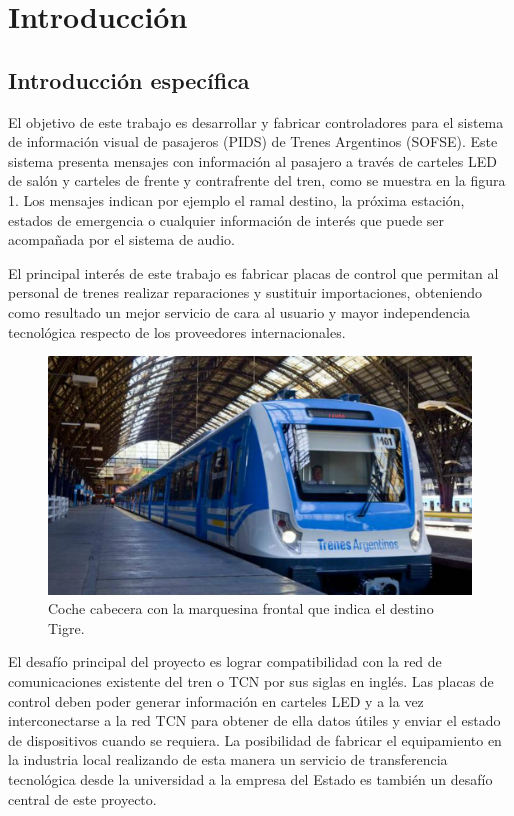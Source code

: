 \documentclass[
11pt, %
]{charter}
\begin{document}
\pagebreak


\section{Introducción}
\label{sec:intro}
\subsection{Introducción específica}
El objetivo de este trabajo es desarrollar y fabricar controladores para el sistema de información visual de pasajeros (PIDS) de Trenes Argentinos (SOFSE). Este sistema presenta mensajes con información al pasajero a través de carteles LED de salón y carteles de frente y contrafrente del tren, como se muestra en la figura 1. Los mensajes indican por ejemplo el ramal destino, la próxima estación, estados de emergencia o cualquier información de interés que puede ser acompañada por el sistema de audio.

El principal interés de este trabajo es fabricar placas de control que permitan al personal de trenes realizar reparaciones y sustituir importaciones, obteniendo como resultado un mejor servicio de cara al usuario y mayor independencia tecnológica respecto de los proveedores internacionales.\\

\begin{figure}[htpb]
\centering 
\includegraphics[width=.75\textwidth]{./Pics/tren.jpg}
\caption{Coche cabecera con la marquesina frontal que indica el destino Tigre.}
\label{fig:cartelFrente}
\end{figure}


El desafío principal del proyecto es lograr  compatibilidad con la red de comunicaciones existente del tren o TCN por sus siglas en inglés. Las placas de control deben poder generar información en carteles LED y a la vez interconectarse a la red TCN para obtener de ella datos útiles y enviar el estado de dispositivos cuando se requiera. La posibilidad de fabricar el equipamiento en la industria local realizando de esta manera un servicio de transferencia tecnológica desde la universidad a la empresa del Estado es también un desafío central de este proyecto.
\pagebreak
\end{document}
